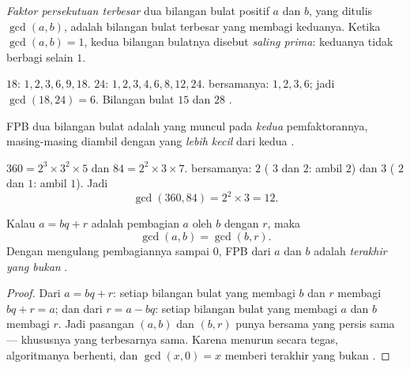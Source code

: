 \begin{definition}[FPB]\label{def:g9:arith:gcd}
\emph{Faktor persekutuan terbesar}
dua bilangan bulat positif $a$ dan $b$, yang ditulis $\gcd(a, b)$,
adalah bilangan bulat terbesar yang membagi keduanya. Ketika
$\gcd(a, b) = 1$, kedua bilangan bulatnya disebut \emph{saling
prima}: keduanya tidak berbagi  selain $1$.
\end{definition}

\begin{example}
 $18$: $1, 2, 3, 6, 9, 18$.  $24$: $1, 2, 3, 4, 6,
8, 12, 24$.  bersamanya: $1, 2, 3, 6$; jadi
$\gcd(18, 24) = 6$. Bilangan bulat $15$ dan $28$ .
\end{example}

\begin{proposition}\label{prop:g9:arith:gcdfact}
FPB dua bilangan bulat adalah   yang muncul
pada \emph{kedua} pemfaktorannya, masing-masing diambil dengan
 yang \emph{lebih kecil} dari kedua .
\end{proposition}
\admitted

\begin{example}\label{ex:g9:arith:gcdfact}
$360 = 2^3 \times 3^2 \times 5$ dan $84 = 2^2 \times 3 \times 7$.
 bersamanya: $2$ ( $3$ dan $2$: ambil $2$)
dan $3$ ( $2$ dan $1$: ambil $1$). Jadi
\[
\gcd(360, 84) = 2^2 \times 3 = 12 .
\]
\end{example}

\begin{theorem}\label{thm:g9:arith:euclidalgo}
Kalau $a = bq + r$ adalah pembagian $a$ oleh $b$ dengan  $r$, maka
\[
\gcd(a, b) = \gcd(b, r).
\]
Dengan mengulang pembagiannya sampai  $0$, FPB dari $a$ dan $b$
adalah \emph{ terakhir yang bukan }.
\end{theorem}

\begin{proof}
Dari $a = bq + r$: setiap bilangan bulat yang membagi $b$ dan $r$
membagi $bq + r = a$; dan dari $r = a - bq$: setiap bilangan bulat
yang membagi $a$ dan $b$ membagi $r$. Jadi pasangan $(a, b)$ dan
$(b, r)$ punya  bersama yang persis sama --- khususnya yang
terbesarnya sama. Karena  menurun secara tegas, algoritmanya
berhenti, dan $\gcd(x, 0) = x$ memberi  terakhir yang bukan .
\end{proof}

